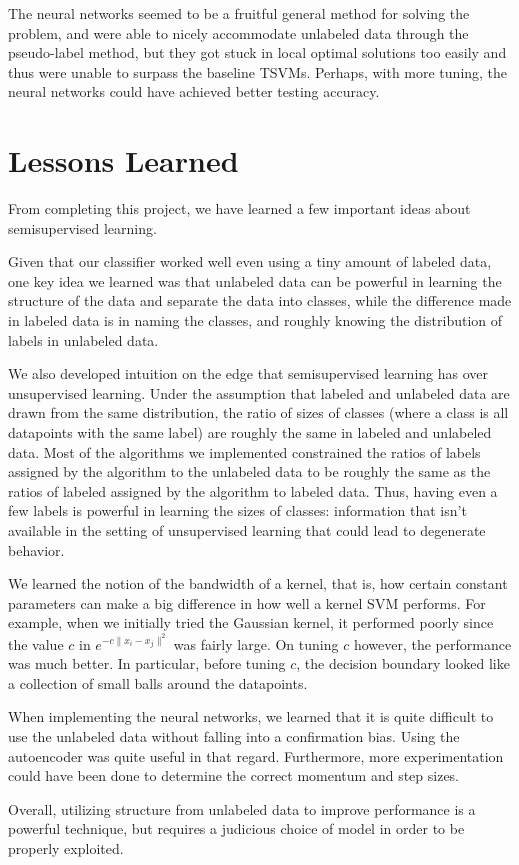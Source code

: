 \documentclass[11pt]{article}
\begin{document}
The neural networks seemed to be a fruitful general method for solving the problem, and were able to nicely accommodate unlabeled data through the pseudo-label method, but they got stuck in local optimal solutions too easily and thus were unable to surpass the baseline TSVMs. Perhaps, with more tuning, the neural networks could have achieved better testing accuracy.
\section{Lessons Learned}

From completing this project, we have learned a few important ideas about semisupervised learning. 

Given that our classifier worked well even using a tiny amount of labeled data,
one key idea we learned was that unlabeled data can be powerful in learning the structure of the data
and separate the data into classes, while the difference made in labeled data is in naming the classes,
and roughly knowing the distribution of labels in unlabeled data.

We also developed intuition on the edge that semisupervised learning has over unsupervised learning.
Under the assumption that labeled and unlabeled data are drawn from the same distribution, the ratio of
sizes of classes (where a class is all datapoints with the same label) are roughly the same in labeled
and unlabeled data. Most of the algorithms we implemented constrained the ratios of labels
assigned by the algorithm to the unlabeled data to be roughly the same as the ratios of labeled assigned
by the algorithm to labeled data. Thus, having even a few labels is powerful in learning the sizes of
classes: information that isn't available in the setting of unsupervised learning that could lead to
degenerate behavior.

We learned the notion of the bandwidth of a kernel, that is,
how certain constant parameters can make a big difference in how well
a kernel SVM performs. For example, when we initially tried the
Gaussian kernel, it performed poorly since the value
$c$ in $e^{-c\|x_i-x_j\|^2}$ was fairly large.
On tuning $c$ however, the performance was much better. In particular,
before tuning $c$, the decision boundary looked like a collection of
small balls around the datapoints.

When implementing the neural networks, we learned that it is quite difficult to use the unlabeled data without falling into a confirmation bias. Using the autoencoder was quite useful in that regard. Furthermore, more experimentation could have been done to determine the correct momentum and step sizes.

Overall, utilizing structure from unlabeled data to improve performance is a powerful technique, but requires a judicious choice of model in order to be properly exploited.



\end{document}

